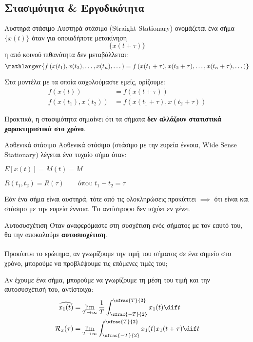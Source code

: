 \documentclass[11pt,a4paper,notitlepage,fleqn,final]{article}
\begin{document}
\subsection{Στασιμότητα \& Εργοδικότητα}
\begin{defn}{Αυστηρά στάσιμο}{}
	Αυστηρά στάσιμο (Straight Stationary) ονομάζεται ένα
	σήμα \( \big\lbrace x(t) \big\rbrace \) όταν για οποιαδήποτε
	μετακίνηση
	\[
	\bigg\lbrace x(t+\tau) \bigg\rbrace
	\]
	η από κοινού πιθανότητα δεν μεταβάλλεται:
	\[
	\mathlarger{
	f\left(x(t_1),x(t_2),\dots,x(t_n),\dots\right) =
	f\left(x(t_1+\tau),x(t_2+\tau),\dots,x(t_n+\tau),\dots\right)
}
	\]
\end{defn}
Στα μοντέλα με τα οποία ασχολούμαστε εμείς, ορίζουμε:
\begin{align*}
	f\left(x(t)\right) &=
	f\left(x(t+\tau)\right) \\
	f\left(x(t_1),x(t_2)\right) &=
	f\left(x(t_1+\tau),x(t_2+\tau)\right)
\end{align*}

Πρακτικά, η στασιμότητα σημαίνει ότι τα σήματα
\textbf{δεν αλλάζουν στατιστικά χαρακτηριστικά στο χρόνο}.

\begin{defn}{Ασθενικά στάσιμο}{}
	Ασθενικά στάσιμο (στάσιμο με την ευρεία έννοια, Wide Sense
	Stationary) λέγεται ένα τυχαίο σήμα όταν:
	\begin{enumroman}
	\item \( 
	E\left[x(t)\right] = M(t) = M
	\)
	\item \( 
	R(t_1,t_2) = R(\tau) \qquad \text{όπου } t_1-t_2=\tau
	 \)
	\end{enumroman}
\end{defn}

Εάν ένα σήμα είναι αυστηρά, τότε από τις ολοκληρώσεις προκύπτει
\( \implies \) ότι είναι και στάσιμο με την ευρεία έννοια. Το
αντίστροφο δεν ισχύει εν γένει.

\begin{defn}{Αυτοσυσχέτιση}{}
	Όταν αναφερόμαστε στη συσχέτιση ενός σήματος με τον εαυτό του,
	θα την αποκαλούμε \textbf{αυτοσυσχέτιση}.
\end{defn}

\paragraph{}
Προκύπτει το ερώτημα, αν γνωρίζουμε την τιμή του σήματος σε ένα
σημείο στο χρόνο, μπορούμε να προβλέψουμε τις επόμενες τιμές του;

Αν έχουμε ένα σήμα, μπορούμε να γνωρίζουμε τη μέση του τιμή και την
αυτοσυσχέτισή του, αντίστοιχα:
\begin{align*}
	\widehat{x_1(t)} &= \lim_{T\to \infty} \frac{1}{T}
	\int_{\sfrac{-T}{2} }^{\sfrac{T}{2} } x_1(t)\dif t
	\\
	\mathcal{R}_x(\tau) &= \lim_{T\to \infty}
	\int_{\sfrac{-T}{2} }^{\sfrac{T}{2} } x_1(t)x_1(t+\tau)\dif t
\end{align*}
\end{document}
